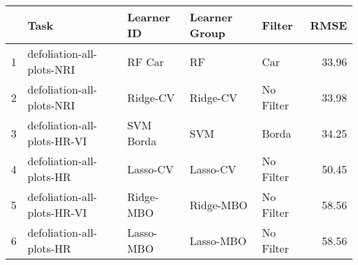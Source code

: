 \begin{table}[ht]
\centering
\begin{tabular}{rllllr}
  \hline
 & Task & Learner ID & Learner Group & Filter & RMSE \\ 
  \hline
1 & defoliation-all-plots-NRI & RF Car & RF & Car & 33.96 \\ 
  2 & defoliation-all-plots-NRI & Ridge-CV & Ridge-CV & No Filter & 33.98 \\ 
  3 & defoliation-all-plots-HR-VI & SVM Borda & SVM & Borda & 34.25 \\ 
  4 & defoliation-all-plots-HR & Lasso-CV & Lasso-CV & No Filter & 50.45 \\ 
  5 & defoliation-all-plots-HR-VI & Ridge-MBO & Ridge-MBO & No Filter & 58.56 \\ 
  6 & defoliation-all-plots-HR & Lasso-MBO & Lasso-MBO & No Filter & 58.56 \\ 
   \hline
\end{tabular}
\end{table}
